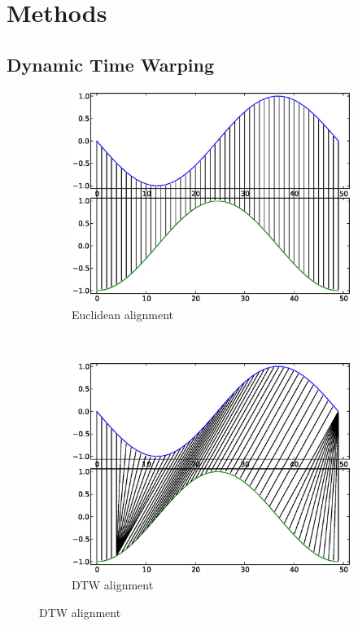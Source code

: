 \documentclass[parskip]{cs4rep}
\begin{document}
\chapter{Methods}
\section{Dynamic Time Warping}
\label{sec:DTW}

\begin{figure}[b,t]
   \centering
   \begin{subfigure}[b]{0.45\textwidth}
       \centering
       \includegraphics[width=\textwidth]{figures/DTW/sin-cos-no-dtw.eps}
       \caption{Euclidean alignment}
       \label{fig:DTW:euclidean_alignment}
   \end{subfigure}
   ~
   \begin{subfigure}[b]{0.45\textwidth}
       \centering
       \includegraphics[width=\textwidth]{figures/DTW/sin-cos-dtw.eps}
       \caption{DTW alignment}
       \label{fig:DTW:dtw_alignment}
   \end{subfigure}
   

\end{figure}
\end{document}
